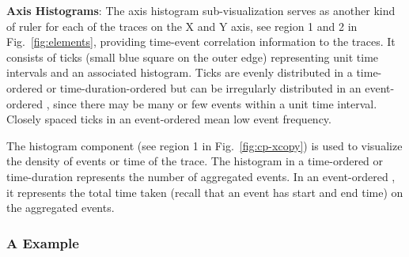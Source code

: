 {\bf Axis Histograms}:
The axis histogram sub-visualization
serves as another kind of ruler for each of the traces on the X and Y axis,
see region 1 and 2 in Fig.~\ref{fig:elements}, providing
time-event correlation information to the traces.
It consists of 
ticks (small blue square on the outer edge) representing unit time intervals
and an associated histogram.
Ticks are evenly distributed in a time-ordered or time-duration-ordered \VDP{}
but can be irregularly distributed in an event-ordered \VDP{},
since there may be many or few events within a unit time interval.
Closely spaced ticks in an event-ordered \VDP{} mean low event frequency.

The histogram component (see region 1 in Fig.~\ref{fig:cp-xcopy})
is used to visualize the density of events or time 
of the trace.
The histogram in a time-ordered or time-duration \VDP{}
represents the number of aggregated events.
In an event-ordered \VDP{},
it represents the total time taken (recall that an event has start and end
time) on the aggregated events.

\subsubsection{A \VDP{} Example}

